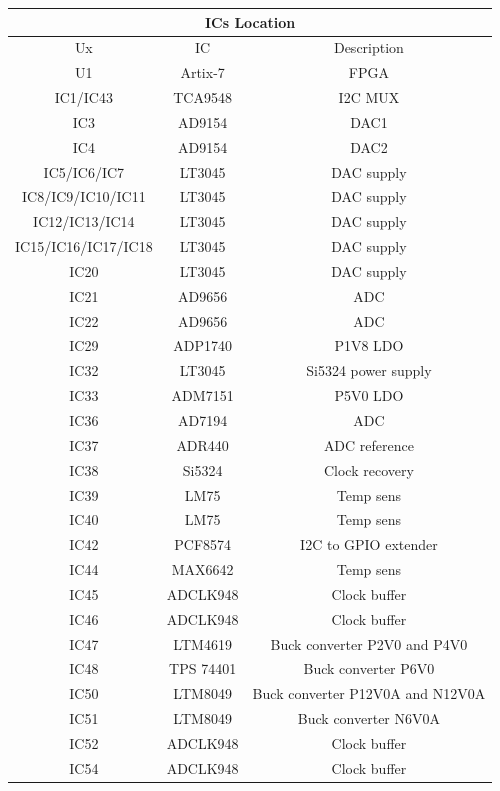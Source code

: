 \begin{longtable}{|c|c|c|} \hline
		\multicolumn{3}{|c|}{ICs Location}\\ \hline	
	Ux & IC & Description \\ \hline
	U1 & Artix-7 & FPGA \\ \hline
	IC1/IC43	&	TCA9548		& I2C MUX 			\\	\hline	
	IC3 & AD9154 & DAC1 \\ \hline
	IC4 & AD9154  & DAC2\\ \hline
	IC5/IC6/IC7	&	LT3045		&  	DAC supply		\\	\hline
	IC8/IC9/IC10/IC11	&	LT3045		&  	DAC supply		\\	\hline	
	IC12/IC13/IC14 & LT3045 & DAC supply \\ \hline
	IC15/IC16/IC17/IC18 & LT3045 & DAC supply \\ \hline	
	IC20	&	LT3045		&  DAC supply			\\	\hline	
	IC21	&	AD9656		&  	ADC		\\	\hline
	IC22 & AD9656 & ADC \\ \hline
	IC29 & ADP1740 & P1V8 LDO \\ \hline	
	IC32 &	LT3045 & Si5324 power supply \\ \hline
	IC33 & ADM7151 & P5V0 LDO \\ \hline
	IC36	&	AD7194		& ADC 			\\	\hline
	IC37	&	ADR440		&  ADC reference			\\	\hline
	IC38 & Si5324 & Clock recovery \\ \hline	
	IC39 & LM75 & Temp sens \\ \hline
	IC40 & LM75 & Temp sens \\ \hline	
	IC42 & PCF8574 & I2C to GPIO extender \\ \hline	
	IC44 & MAX6642 & Temp sens \\ \hline
	IC45	&	ADCLK948		&  Clock buffer		\\	\hline
	IC46	&	ADCLK948		& Clock buffer 		\\	\hline					
	IC47 & LTM4619 & Buck converter P2V0 and P4V0\\ \hline
	IC48 & TPS 74401  & Buck converter P6V0\\ \hline
	IC50 &  LTM8049 & Buck converter P12V0A and N12V0A \\ \hline
	IC51 & LTM8049& Buck converter N6V0A \\ \hline
	IC52 & ADCLK948 & Clock buffer \\ \hline
	IC54 &ADCLK948 & Clock buffer \\ \hline	

\end{longtable}
